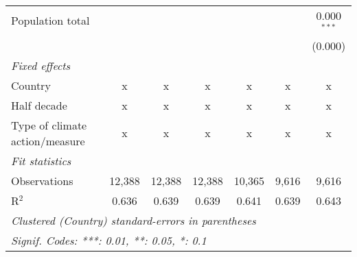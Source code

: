 \begin{tabular}{lcccccc}
   Population total                                                              &         &              &              &               &               & 0.000$^{***}$\\   
                                                                                 &         &              &              &               &               & (0.000)\\   
   \emph{Fixed effects}\\
   Country                                                                       & x       & x            & x            & x             & x             & x\\  
   Half decade                                                                   & x       & x            & x            & x             & x             & x\\  
   Type of climate action/measure                                                & x       & x            & x            & x             & x             & x\\  
   \midrule \emph{Fit statistics}\\
   Observations                                                                  & 12,388  & 12,388       & 12,388       & 10,365        & 9,616         & 9,616\\  
   R$^2$                                                                         & 0.636   & 0.639        & 0.639        & 0.641         & 0.639         & 0.643\\  
   \midrule
   \multicolumn{7}{l}{\emph{Clustered (Country) standard-errors in parentheses}}\\
   \multicolumn{7}{l}{\emph{Signif. Codes: ***: 0.01, **: 0.05, *: 0.1}}\\
\end{tabular}
\par\endgroup


